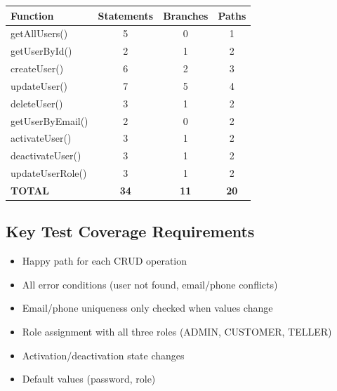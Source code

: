\begin{longtable}{|l|c|c|c|}
\hline
\textbf{Function} & \textbf{Statements} & \textbf{Branches} & \textbf{Paths} \\
\hline
getAllUsers() & 5 & 0 & 1 \\
\hline
getUserById() & 2 & 1 & 2 \\
\hline
createUser() & 6 & 2 & 3 \\
\hline
updateUser() & 7 & 5 & 4 \\
\hline
deleteUser() & 3 & 1 & 2 \\
\hline
getUserByEmail() & 2 & 0 & 2 \\
\hline
activateUser() & 3 & 1 & 2 \\
\hline
deactivateUser() & 3 & 1 & 2 \\
\hline
updateUserRole() & 3 & 1 & 2 \\
\hline
\textbf{TOTAL} & \textbf{34} & \textbf{11} & \textbf{20} \\
\hline
\end{longtable}

\subsection{Key Test Coverage Requirements}
\begin{itemize}
    \item Happy path for each CRUD operation
    \item All error conditions (user not found, email/phone conflicts)
    \item Email/phone uniqueness only checked when values change
    \item Role assignment with all three roles (ADMIN, CUSTOMER, TELLER)
    \item Activation/deactivation state changes
    \item Default values (password, role)
\end{itemize}
